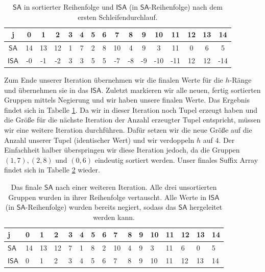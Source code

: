 \begin{table}[]
\small
\begin{tabular}{|c|c|c|c|c|c|c|c|c|c|c|c|c|c|c|c|}
\hline
j                              & 0  & 1  & 2  & 3 & 4 & 5 & 6 & 7  & 8 & 9  & 10  & 11  & 12 & 13 & 14  \\ \hline
$\mathsf{SA}$               & 14 & 13 & 12 & 1 & 7 & 2 & 8 & 10 & 4 & 9  & 3   & 11  & 0  & 6  & 5   \\ \hline
$\mathsf{ISA}$ & -0 & -1 & -2 & 3 & 3 & 5 & 5 & -7  & -8 & -9 & -10 & -11 & 12 & 12 & -14 \\ \hline
\end{tabular}
\caption{$\mathsf{SA}$ in sortierter Reihenfolge und $\mathsf{ISA}$ (in $\mathsf{SA}$-Reihenfolge) nach dem ersten Schleifendurchlauf.}
\label{tab:osipov-iteration}
\end{table}

Zum Ende unserer Iteration übernehmen wir die finalen Werte für die $h$-Ränge und übernehmen sie in das $\mathsf{ISA}$. Zuletzt markieren wir alle neuen, fertig sortierten Gruppen mittels Negierung und wir haben unsere finalen Werte. Das Ergebnis findet sich in Tabelle \ref{tab:osipov-iteration}. Da wir in dieser Iteration noch Tupel erzeugt haben und die Größe für die nächste Iteration der Anzahl erzeugter Tupel entspricht, müssen wir eine weitere Iteration durchführen. Dafür setzen wir die neue Größe auf die Anzahl unserer Tupel (identischer Wert) und wir verdoppeln $h$ auf $4$. Der Einfachheit halber überspringen wir diese Iteration jedoch, da die Gruppen $(1, 7), (2,8)$ und $(0,6)$ eindeutig sortiert werden. Unser finales Suffix Array findet sich in Tabelle \ref{tab:osipov-final} wieder.

\begin{table}[]
\small
\begin{tabular}{|l|l|l|l|l|l|l|l|l|l|l|l|l|l|l|l|}
\hline
j                              & 0  & 1  & 2  & 3  & 4  & 5  & 6  & 7  & 8  & 9  & 10  & 11  & 12  & 13  & 14  \\ \hline
$\mathsf{SA}$               & 14 & 13 & 12 & 7  & 1  & 8  & 2  & 10 & 4  & 9  & 3   & 11  & 6   & 0   & 5   \\ \hline
$\mathsf{ISA}$ & 0 & 1 & 2 & 3 & 4 & 5 & 6 & 7 & 8 & 9 & 10 & 11 & 12 & 13 & 14 \\ \hline
\end{tabular}
\caption{Das finale $\mathsf{SA}$ nach einer weiteren Iteration. Alle drei unsortierten Gruppen wurden in ihrer Reihenfolge vertauscht. Alle Werte in $\mathsf{ISA}$ (in $\mathsf{SA}$-Reihenfolge) wurden bereits negiert, sodass das $\mathsf{SA}$ hergeleitet werden kann.}
\label{tab:osipov-final}
\end{table}

